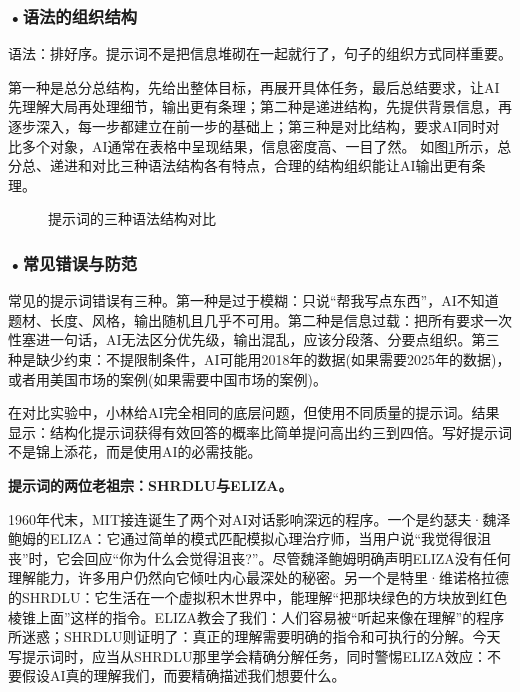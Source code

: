 \subsubsection*{\textbf{•语法的组织结构}}

语法：排好序。提示词不是把信息堆砌在一起就行了，句子的组织方式同样重要。

第一种是总分总结构，先给出整体目标，再展开具体任务，最后总结要求，让AI先理解大局再处理细节，输出更有条理；第二种是递进结构，先提供背景信息，再逐步深入，每一步都建立在前一步的基础上；第三种是对比结构，要求AI同时对比多个对象，AI通常在表格中呈现结果，信息密度高、一目了然。 如图\ref{fig:ch3_3_3}所示，总分总、递进和对比三种语法结构各有特点，合理的结构组织能让AI输出更有条理。

\begin{figure}[H]
\centering
{}
\caption{提示词的三种语法结构对比}
\label{fig:ch3_3_3}
\end{figure}





\subsubsection*{\textbf{•常见错误与防范}}


常见的提示词错误有三种。第一种是过于模糊：只说“帮我写点东西”，AI不知道题材、长度、风格，输出随机且几乎不可用。第二种是信息过载：把所有要求一次性塞进一句话，AI无法区分优先级，输出混乱，应该分段落、分要点组织。第三种是缺少约束：不提限制条件，AI可能用2018年的数据(如果需要2025年的数据)，或者用美国市场的案例(如果需要中国市场的案例)。

在对比实验中，小林给AI完全相同的底层问题，但使用不同质量的提示词。结果显示：结构化提示词获得有效回答的概率比简单提问高出约三到四倍。写好提示词不是锦上添花，而是使用AI的必需技能。
\begin{funbox}
\textbf{提示词的两位老祖宗：SHRDLU与ELIZA。} 

1960年代末，MIT接连诞生了两个对AI对话影响深远的程序。一个是约瑟夫·魏泽鲍姆的ELIZA：它通过简单的模式匹配模拟心理治疗师，当用户说“我觉得很沮丧”时，它会回应“你为什么会觉得沮丧?”。尽管魏泽鲍姆明确声明ELIZA没有任何理解能力，许多用户仍然向它倾吐内心最深处的秘密。另一个是特里·维诺格拉德的SHRDLU：它生活在一个虚拟积木世界中，能理解“把那块绿色的方块放到红色棱锥上面”这样的指令。ELIZA教会了我们：人们容易被“听起来像在理解”的程序所迷惑；SHRDLU则证明了：真正的理解需要明确的指令和可执行的分解。今天写提示词时，应当从SHRDLU那里学会精确分解任务，同时警惕ELIZA效应：不要假设AI真的理解我们，而要精确描述我们想要什么。
\end{funbox}

